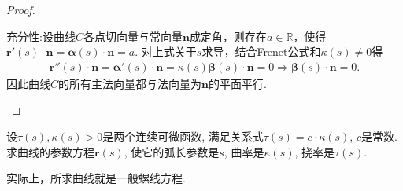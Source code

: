 \documentclass[../../main.tex]{subfiles}%
\begin{document}
\begin{proof}
\begin{enumerate}[(1)]
{\heiti 充分性:}设曲线$C$各点切向量与常向量$\bm{n}$成定角，则存在$a\in\mathbb{R}$，使得
$\bm{r}'(s)\cdot\bm{n}=\bm{\alpha}(s)\cdot\bm{n}=a.$
对上式关于$s$求导，结合\hyperref[theorem:微分几何-Frenet公式]{Frenet公式}和$\kappa(s)\ne0$得
\begin{align*}
\bm{r}''(s)\cdot\bm{n}=\bm{\alpha}'(s)\cdot\bm{n}=\kappa(s)\bm{\beta}(s)\cdot\bm{n}=0\Longrightarrow \bm{\beta}(s)\cdot\bm{n}=0.
\end{align*}
因此曲线$C$的所有主法向量都与法向量为$\bm{n}$的平面平行.
\end{enumerate}
\end{proof}

\begin{example}
设$\tau(s),\kappa(s) > 0$是两个连续可微函数, 满足关系式$\tau(s) = c \cdot \kappa(s)$, $c$是常数. 求曲线的参数方程$\bm{r}(s)$, 使它的弧长参数是$s$, 曲率是$\kappa(s)$, 挠率是$\tau(s)$.
\end{example}
\begin{remark}
实际上，所求曲线就是一般螺线方程.
\end{remark}
\end{document}
